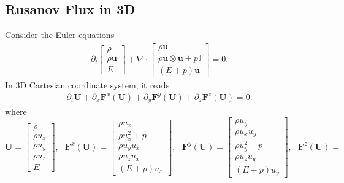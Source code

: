 \documentclass{report}
\begin{document}
\begin{appendices}
\chapter{Rusanov Flux in 3D} \label{app:flux}
Consider the Euler equations
\begin{align} \label{equ:euler}
    \partial_t
    \begin{bmatrix}
    \rho \\
    \rho \mathbf{u} \\
    E
    \end{bmatrix}
    + \nabla \cdot
    \begin{bmatrix}
    \rho \mathbf{u} \\
    \rho \mathbf{u} \otimes \mathbf{u} + p\mathbb{I} \\
    (E+p)\mathbf{u}
    \end{bmatrix}
    = 0.
\end{align}
In 3D Cartesian coordinate system, it reads 
\begin{align} \label{equ:euler_xyz}
    \partial_t \mathbf{U} + \partial_x \mathbf{F}^x(\mathbf{U}) + \partial_y \mathbf{F}^y(\mathbf{U}) + \partial_z \mathbf{F}^z(\mathbf{U}) = 0.
\end{align}
where
\begin{equation*}
    \mathbf{U} =
    \begin{bmatrix}
    \rho \\
    \rho u_x \\
    \rho u_y \\
    \rho u_z \\
    E
    \end{bmatrix}, \ \ \ 
    \mathbf{F}^x(\mathbf{U}) =
    \begin{bmatrix}
    \rho u_x \\
    \rho u_x^2 + p \\
    \rho u_y u_x  \\
    \rho u_z u_x \\
    (E + p)u_x
    \end{bmatrix}, \ \ \ 
    \mathbf{F}^y(\mathbf{U}) =
    \begin{bmatrix}
    \rho u_y \\
    \rho u_x u_y \\
    \rho u_y^2 + p \\
    \rho u_z u_y \\
    (E + p)u_y
    \end{bmatrix}, \ \ \ 
    \mathbf{F}^z(\mathbf{U}) =

\end{equation*}
\end{appendices}
\end{document}
